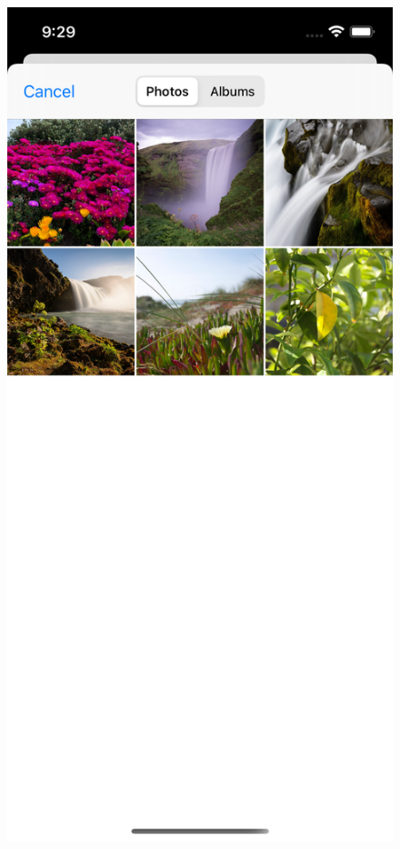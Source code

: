 \documentclass[a4paper,11pt]{article}
\begin{document}
\begin{figure}[H]
\includegraphics[scale=0.1]{img/test_app/testapp_library.png}

\end{figure}
\end{document}
